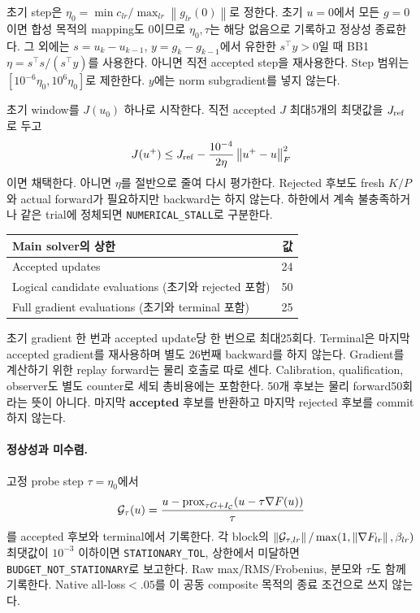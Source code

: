 \documentclass[11pt]{article}
\newcommand{\norm}[1]{\left\lVert #1\right\rVert}
\begin{document}
초기 step은 $\eta_0=\min c_{lr}/\max_{lr}\norm{g_{lr}(0)}$로 정한다.
초기 $u=0$에서 모든 $g=0$이면 합성 목적의 mapping도 0이므로
$\eta_0,\tau$는 해당 없음으로 기록하고 정상성 종료한다.
그 외에는 $s=u_k-u_{k-1}$, $y=g_k-g_{k-1}$에서
유한한 $s^\top y>0$일 때 BB1 $\eta=s^\top s/(s^\top y)$를 사용한다.
아니면 직전 accepted step을 재사용한다.
Step 범위는 $[10^{-6}\eta_0,10^6\eta_0]$로 제한한다.
$y$에는 norm subgradient를 넣지 않는다.

초기 window를 $J(u_0)$ 하나로 시작한다.
직전 accepted $J$ 최대5개의 최댓값을 $J_{\rm ref}$로 두고
\[
 J(u^+)\le J_{\rm ref}
 -\frac{10^{-4}}{2\eta}\norm{u^+-u}_F^2
\]
이면 채택한다. 아니면 $\eta$를 절반으로 줄여 다시 평가한다.
Rejected 후보도 fresh $K/P$와 actual forward가 필요하지만 backward는 하지 않는다.
하한에서 계속 불충족하거나 같은 trial에 정체되면
\texttt{NUMERICAL\_STALL}로 구분한다.

\begin{center}
\begin{tabular}{lr}
\toprule
Main solver의 상한 & 값\\
\midrule
Accepted updates & 24\\
Logical candidate evaluations (초기와 rejected 포함) & 50\\
Full gradient evaluations (초기와 terminal 포함) & 25\\
\bottomrule
\end{tabular}
\end{center}
초기 gradient 한 번과 accepted update당 한 번으로 최대25회다.
Terminal은 마지막 accepted gradient를 재사용하며 별도 26번째 backward를 하지 않는다.
Gradient를 계산하기 위한 replay forward는 물리 호출로 따로 센다.
Calibration, qualification, observer도 별도 counter로 세되 총비용에는 포함한다.
50개 후보는 물리 forward50회라는 뜻이 아니다.
마지막 \textbf{accepted} 후보를 반환하고 마지막 rejected 후보를 commit하지 않는다.

\paragraph{정상성과 미수렴.}
고정 probe step $\tau=\eta_0$에서
\[
 {\cal G}_\tau(u)=
 \frac{u-\operatorname{prox}_{\tau G+I_{\mathcal C}}
                    (u-\tau\nabla F(u))}{\tau}
\]
를 accepted 후보와 terminal에서 기록한다.
각 block의 $\norm{{\cal G}_{\tau,lr}}/
\max(1,\norm{\nabla F_{lr}},\beta_{lr})$ 최댓값이 $10^{-3}$ 이하이면
\texttt{STATIONARY\_TOL}, 상한에서 미달하면
\texttt{BUDGET\_NOT\_STATIONARY}로 보고한다.
Raw max/RMS/Frobenius, 분모와 $\tau$도 함께 기록한다.
Native all-loss$<.05$를 이 공동 composite 목적의 종료 조건으로 쓰지 않는다.
\end{document}
